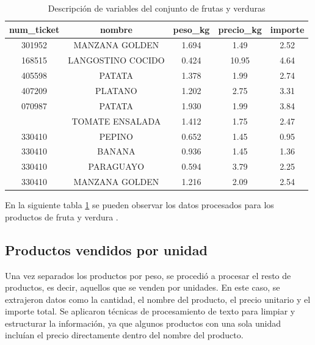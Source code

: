 \documentclass[,article,submit,moreauthors,pdftex]{Definitions/mdpi}
\begin{document}
\begin{table}

\caption{\label{tab:tabla_fruta_verdura}Descripción de variables del conjunto de frutas y verduras}
\centering
\begin{tabular}[t]{ccccc}
\toprule
num\_ticket & nombre & peso\_kg & precio\_kg & importe\\
\midrule
301952 & MANZANA GOLDEN & 1.694 & 1.49 & 2.52\\
168515 & LANGOSTINO COCIDO & 0.424 & 10.95 & 4.64\\
405598 & PATATA & 1.378 & 1.99 & 2.74\\
407209 & PLATANO & 1.202 & 2.75 & 3.31\\
070987 & PATATA & 1.930 & 1.99 & 3.84\\
\addlinespace
070987 & TOMATE ENSALADA & 1.412 & 1.75 & 2.47\\
330410 & PEPINO & 0.652 & 1.45 & 0.95\\
330410 & BANANA & 0.936 & 1.45 & 1.36\\
330410 & PARAGUAYO & 0.594 & 3.79 & 2.25\\
330410 & MANZANA GOLDEN & 1.216 & 2.09 & 2.54\\
\bottomrule
\end{tabular}
\end{table}

En la siguiente tabla \ref{tab:tabla_fruta_verdura} se pueden observar
los datos procesados para los productos de fruta y verdura .

\hypertarget{productos-vendidos-por-unidad}{%
\subsection{Productos vendidos por
unidad}\label{productos-vendidos-por-unidad}}

Una vez separados los productos por peso, se procedió a procesar el
resto de productos, es decir, aquellos que se venden por unidades. En
este caso, se extrajeron datos como la cantidad, el nombre del producto,
el precio unitario y el importe total. Se aplicaron técnicas de
procesamiento de texto para limpiar y estructurar la información, ya que
algunos productos con una sola unidad incluían el precio directamente
dentro del nombre del producto.
\end{document}
